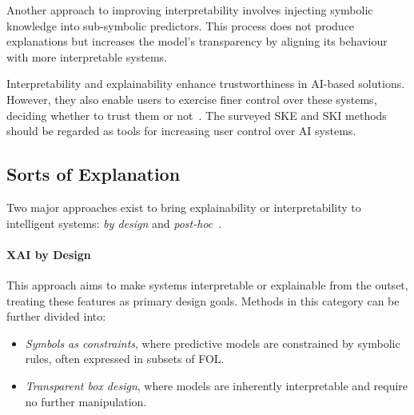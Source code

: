 Another approach to improving interpretability involves injecting symbolic knowledge into sub-symbolic predictors.
%
This process does not produce explanations but increases the model's transparency by aligning its behaviour with more interpretable systems.

Interpretability and explainability enhance trustworthiness in \gls{AI}-based solutions.
%
However, they also enable users to exercise finer control over these systems, deciding whether to trust them or not~\cite{10.1214/21-SS133}.
%
The surveyed \gls{SKE} and \gls{SKI} methods should be regarded as tools for increasing user control over \gls{AI} systems.


\subsection{Sorts of Explanation}\label{subsec:sorts-of-explanation}
%
Two major approaches exist to bring explainability or interpretability to intelligent systems: \emph{by design} and \emph{post-hoc}~\cite{DBLP:conf/atal/CiattoSOC20,DBLP:journals/inffus/ArrietaRSBTBGGM20,DBLP:journals/csur/GuidottiMRTGP19}.


\paragraph{\Gls{XAI} by Design}
\label{par:xai-by-design}
%
This approach aims to make systems interpretable or explainable from the outset, treating these features as primary design goals.
%
Methods in this category can be further divided into:
%
\begin{itemize}
    \item \emph{Symbols as constraints}, where predictive models are constrained by symbolic rules, often expressed in subsets of \gls{FOL}.
    \item \emph{Transparent box design}, where models are inherently interpretable and require no further manipulation.
\end{itemize}


